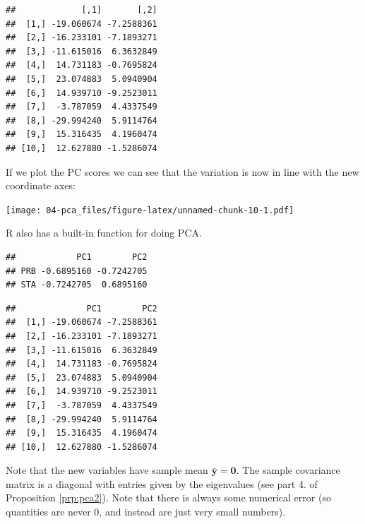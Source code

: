 \documentclass[
]{book}
\newenvironment{Shaded}{\begin{snugshade}}{\end{snugshade}}
\newcommand{\CommentTok}[1]{\textcolor[rgb]{0.56,0.35,0.01}{\textit{#1}}}
\newcommand{\DecValTok}[1]{\textcolor[rgb]{0.00,0.00,0.81}{#1}}
\newcommand{\FunctionTok}[1]{\textcolor[rgb]{0.13,0.29,0.53}{\textbf{#1}}}
\newcommand{\NormalTok}[1]{#1}
\newcommand{\OtherTok}[1]{\textcolor[rgb]{0.56,0.35,0.01}{#1}}
\newcommand{\SpecialCharTok}[1]{\textcolor[rgb]{0.81,0.36,0.00}{\textbf{#1}}}
\theoremstyle{definition}
\theoremstyle{definition}
\theoremstyle{definition}
\theoremstyle{definition}
\theoremstyle{remark}
\begin{document}
\begin{verbatim}
##             [,1]       [,2]
##  [1,] -19.060674 -7.2588361
##  [2,] -16.233101 -7.1893271
##  [3,] -11.615016  6.3632849
##  [4,]  14.731183 -0.7695824
##  [5,]  23.074883  5.0940904
##  [6,]  14.939710 -9.2523011
##  [7,]  -3.787059  4.4337549
##  [8,] -29.994240  5.9114764
##  [9,]  15.316435  4.1960474
## [10,]  12.627880 -1.5286074
\end{verbatim}

If we plot the PC scores we can see that the variation is now in line with the new coordinate axes:

\texttt{[image: 04-pca\_files/figure-latex/unnamed-chunk-10-1.pdf]}

R also has a built-in function for doing PCA.

\begin{Shaded}
\end{Shaded}

\begin{verbatim}
##            PC1        PC2
## PRB -0.6895160 -0.7242705
## STA -0.7242705  0.6895160
\end{verbatim}

\begin{Shaded}
\end{Shaded}

\begin{verbatim}
##              PC1        PC2
##  [1,] -19.060674 -7.2588361
##  [2,] -16.233101 -7.1893271
##  [3,] -11.615016  6.3632849
##  [4,]  14.731183 -0.7695824
##  [5,]  23.074883  5.0940904
##  [6,]  14.939710 -9.2523011
##  [7,]  -3.787059  4.4337549
##  [8,] -29.994240  5.9114764
##  [9,]  15.316435  4.1960474
## [10,]  12.627880 -1.5286074
\end{verbatim}

Note that the new variables have sample mean \(\bar{\mathbf y}={\boldsymbol 0}\). The sample covariance matrix is a diagonal with entries given by the eigenvalues (see part 4. of Proposition \ref{prp:pca2}). Note that there is always some numerical error (so quantities are never 0, and instead are just very small numbers).
\end{document}
